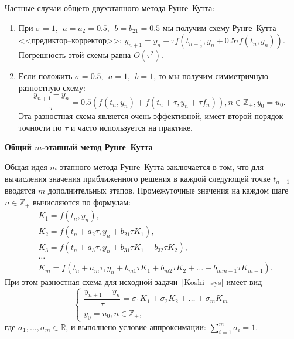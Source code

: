 Частные случаи общего двухэтапного метода Рунге--Кутта:

\begin{enumerate}
%
    \item При $\sigma=1,~~a=a_2=0.5,~~b=b_{21}=0.5$ мы получим схему Рунге--Кутта <<предиктор--корректор>>:
    $y_{n+1} = y_n + \tau f(t_{n+\frac12}, y_n + 0.5\tau f(t_n, y_n)).$
    Погрешность этой схемы равна $O(\tau^2)$.

    \item Если положить $\sigma=0.5,~~a=1,~~b=1$, то мы получим симметричную разностную схему:
    $$\dfrac{y_{n+1} - y_n}{\tau} = 0.5 \left(f(t_n, y_n) +
      f(t_n + \tau, y_n + \tau f_n)\right), n\in\mathbb{Z}_+, y_0 = u_0.
    $$
    Эта разностная схема является очень эффективной, имеет второй
    порядок точности по $\tau$ и часто используется на практике.
\end{enumerate}




\centerline{\textbf{Общий $m$-этапный метод Рунге--Кутта}}

Общая идея $m$-этапного метода Рунге--Кутта заключается в том, что
для вычисления значения приближенного решения в каждой следующей точке $t_{n+1}$
вводятся $m$ дополнительных этапов.
Промежуточные значения на каждом шаге $n\in\mathbb{Z}_+$ вычисляются по формулам:
$$
\begin{aligned}
%
    &K_1 = f(t_n, y_n), \\
    &K_2 = f(t_n + a_2\tau, y_n + b_{21} \tau K_1), \\
    &K_3 = f(t_n + a_3\tau, y_n + b_{31}\tau K_1 + b_{32}\tau K_2), \\
    &\dots \\
    &K_m = f(t_n+a_m\tau, y_n + b_{m1} \tau K_1 + b_{m2} \tau K_2 + \ldots + b_{m m -1} \tau K_{m-1}).
%
\end{aligned}
$$
%
При этом разностная схема для исходной задачи~\eqref{Koshi_sys}
имеет вид
%
\begin{equation}
    \label{gen_Runge-Kutt_meth}
    \begin{cases}
        \dfrac{y_{n+1} - y_n}{\tau} = \sigma_1 K_1 + \sigma_2 K_2 + \ldots + \sigma_m K_m \\
        y_0 = u_0, n \in \mathbb{Z}_+,
    \end{cases}
\end{equation}
%
где $\sigma_1, \ldots, \sigma_m \in\mathbb{R}$, и выполнено условие аппроксимации: $\sum\limits_{i=1}^{m} \sigma_i = 1.$

